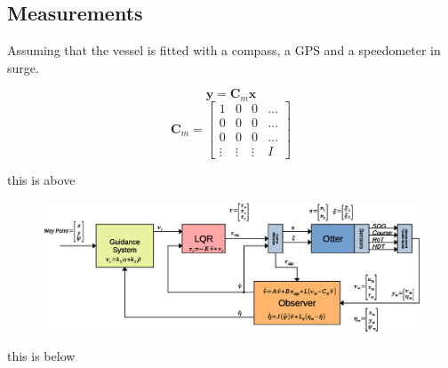 \documentclass[12pt,a4]{article}
\begin{document}
\subsection{Measurements}

Assuming that the vessel is fitted with a compass, a GPS and a speedometer in surge.

\begin{equation}
	\bm{y} = 		\bm{C}_m	\bm{x}
\end{equation}
\begin{equation}
	\bm{C}_m =	\begin{bmatrix} 1 & 0 & 0 & \dots \\ 0 & 0 & 0 & \dots \\ 0 & 0 & 0 & \dots  \\ \vdots & \vdots & \vdots & I \end{bmatrix}
\end{equation}


this is above
\begin{figure}[H]
	\includegraphics[width = \textwidth]{graphics/BlokDiagram.eps}
	\caption{}
	\label{}
\end{figure}
this is below
\end{document}
